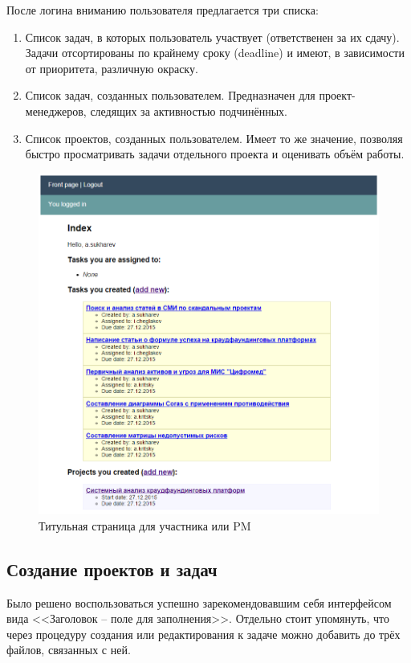\documentclass[a4paper, 14pt]{extarticle}
\begin{document}
После логина вниманию пользователя предлагается три списка:

\begin{enumerate}
\item Список задач, в которых пользователь участвует (ответственен за их сдачу). Задачи отсортированы по крайнему сроку (deadline) и имеют, в зависимости от приоритета, различную окраску.
\item Список задач, созданных пользователем. Предназначен для проект-менеджеров, следящих за активностью подчинённых.
\item Список проектов, созданных пользователем. Имеет то же значение, позволяя быстро просматривать задачи отдельного проекта и оценивать объём работы.
\end{enumerate}

\begin{figure}[!htb]
  \centering
    \includegraphics[scale=0.8]{../shared_images/frontend/title-logged-in.png}
   \caption{Титульная страница для участника или PM}
    \label{fig:start}
\end{figure}

\subsection{Создание проектов и задач}
Было решено воспользоваться успешно зарекомендовавшим себя интерфейсом вида <<Заголовок -- поле для заполнения>>. Отдельно стоит упомянуть, что через процедуру создания или редактирования к задаче можно добавить до трёх файлов, связанных с ней.
\end{document}
